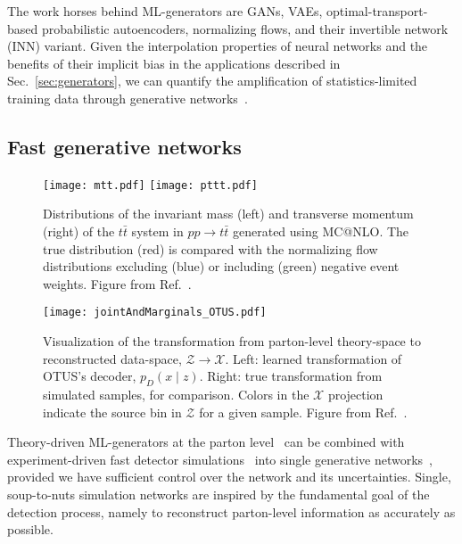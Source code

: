 \documentclass[submission,Phys]{SciPost}
\begin{document}
The work horses behind ML-generators are GANs, VAEs, optimal-transport-based probabilistic autoencoders, normalizing flows, and their invertible network (INN) variant. Given the interpolation properties of neural networks and the benefits of their implicit bias in the applications described in Sec.~\ref{sec:generators}, we can quantify the amplification of statistics-limited training data through generative networks~\cite{Butter:2020qhk,Bieringer:2022cbs}. 

\subsection{Fast generative networks}
\label{sec:onestage_fast}

\begin{figure}[b!]
    \texttt{[image: mtt.pdf]}
    \texttt{[image: pttt.pdf]}
    \caption{Distributions of the invariant mass (left) and transverse momentum (right) of the $t\bar{t}$ system in $pp\to t\bar{t}$ generated using MC@NLO. The true distribution (red) is compared with the normalizing flow distributions excluding (blue) or including (green) negative event weights. Figure from Ref.~\cite{Stienen:2020gns}.}
    \label{fig:nf-negative-weights}
\end{figure}

\begin{figure}[t]
\centering
  \texttt{[image: jointAndMarginals\_OTUS.pdf]}  
  \caption{Visualization of the transformation from parton-level theory-space to reconstructed data-space, $\mathcal{Z} \rightarrow \mathcal{X}$. Left: learned transformation of OTUS's decoder, $p_D(x \mid z)$. Right: true transformation from simulated samples, for comparison. Colors in the $\mathcal{X}$ projection indicate the source bin in $\mathcal{Z}$ for a given sample. Figure from Ref.~\cite{Howard:2021pos}.}
  \label{fig:jointAndMarginals_OTUS}
\end{figure}

Theory-driven ML-generators at the parton level~\cite{Butter:2019cae,Butter:2021csz} can be combined with experiment-driven fast detector simulations~\cite{calogan1,calogan2,fast_accurate,aachen_wgan1,aachen_wgan2,ATLASsimGAN,Belayneh:2019vyx,Buhmann:2020pmy,Buhmann:2021lxj,Chen:2021gdz,Krause:2021ilc,Krause:2021wez} into single generative networks~\cite{dutch,gan_datasets,DijetGAN2,ArjonaMartinez:2019ahl,Alanazi:2020klf,Howard:2021pos}, provided we have sufficient control over the network and its uncertainties. Single, soup-to-nuts simulation networks are inspired by the fundamental goal of the detection process, namely to reconstruct parton-level information as accurately as possible.
\end{document}

